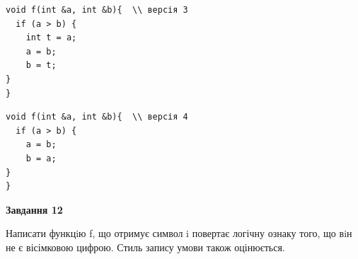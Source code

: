 \documentclass[12pt, ukrainian]{article}
\begin{document}
{\begin {large}
\begin{minipage}[t]{11.0cm}
\vspace{-8mm}\begin{verbatim}
void f(int &a, int &b){  \\ версія 3
  if (a > b) {
    int t = a;
    a = b;
    b = t;
}  
}
\end{verbatim}

\vspace{-8mm}\begin{verbatim}
void f(int &a, int &b){  \\ версія 4
  if (a > b) {
    a = b;
    b = a;
}  
}
\end{verbatim}



\begin{center}
\textbf{Завдання 12}
\end{center}

Написати функцiю f, що отримує символ i повертає логічну ознаку того, що вiн не є вісімковою цифрою. Стиль запису умови також оцінюється.\par

\end{minipage}

\end {large}}
\newpage
\end{document}
